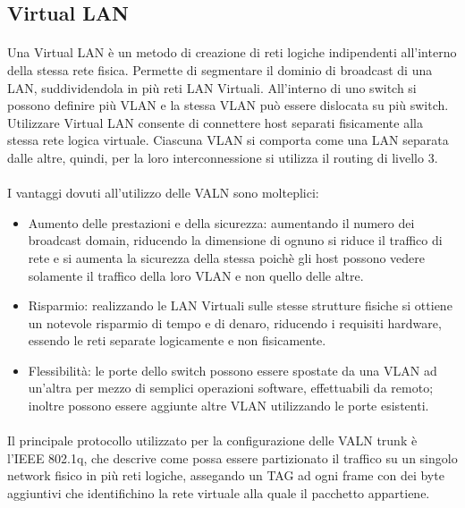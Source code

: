 \subsection{Virtual LAN}
\paragraph{} Una Virtual LAN è un metodo di creazione di reti logiche indipendenti all'interno della stessa rete fisica. Permette di segmentare il dominio di broadcast di una LAN, suddividendola in più reti LAN Virtuali. All'interno di uno switch si possono definire più VLAN e la stessa VLAN può essere dislocata su più switch. Utilizzare Virtual LAN consente di connettere host separati fisicamente alla stessa rete logica virtuale. Ciascuna VLAN si comporta come una LAN separata dalle altre, quindi, per la loro interconnessione si utilizza il routing di livello 3.
\paragraph{} I vantaggi dovuti all'utilizzo delle VALN sono molteplici:
\begin{itemize} 
	\item Aumento delle prestazioni e della sicurezza: aumentando il numero dei broadcast domain, riducendo la dimensione di ognuno si riduce il traffico di rete e si aumenta la sicurezza della stessa poichè gli host possono vedere solamente il traffico della loro VLAN e non quello delle altre. 
	\item Risparmio: realizzando le LAN Virtuali sulle stesse strutture fisiche si ottiene un notevole risparmio di tempo e di denaro, riducendo i requisiti hardware, essendo le reti separate logicamente e non fisicamente. 
	\item Flessibilità: le porte dello switch possono essere spostate da una VLAN ad un'altra per mezzo di semplici operazioni software, effettuabili da remoto; inoltre possono essere aggiunte altre VLAN utilizzando le porte esistenti.
\end{itemize}
\paragraph{} Il principale protocollo utilizzato per la configurazione delle VALN trunk è l'IEEE 802.1q, che descrive come possa essere partizionato il traffico su un singolo network fisico in più reti logiche, assegando un TAG ad ogni frame con dei byte aggiuntivi che identifichino la rete virtuale alla quale il pacchetto appartiene. 

